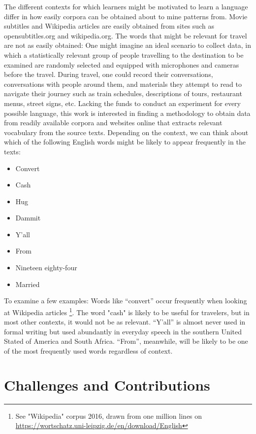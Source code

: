 The different contexts for which learners might be motivated to learn a language differ in how easily corpora can be obtained about to mine patterns from. Movie subtitles and Wikipedia articles are easily obtained from sites such as opensubtitles.org and wikipedia.org. The words that might be relevant for travel are not as easily obtained: One might imagine an ideal scenario to collect data, in which a statistically relevant group of people travelling to the destination to be examined are randomly selected and equipped with microphones and cameras before the travel. During travel, one could record their conversations, conversations with people around them, and materials they attempt to read to navigate their journey such as train schedules, descriptions of tours, restaurant menus, street signs, etc. Lacking the funds to conduct an experiment for every possible language, this work is interested in finding a methodology to obtain data from readily available corpora and websites online that extracts relevant vocabulary from the source texts.
Depending on the context, we can think about which of the following English words might be likely to appear frequently in the texts:

\begin{itemize}
	\item Convert
	\item Cash
	\item Hug
	\item Dammit
	\item Y'all
	\item From
	\item Nineteen eighty-four
	\item Married
\end{itemize}

To examine a few examples: Words like “convert” occur frequently when looking at Wikipedia articles \footnote{See "Wikipedia" corpus 2016, drawn from one million lines on \url{https://wortschatz.uni-leipzig.de/en/download/English}}. The word "cash" is likely to be useful for travelers, but in most other contexts, it would not be as relevant. “Y’all” is almost never used in formal writing but used abundantly in everyday speech in the southern United Stated of America and South Africa. “From”, meanwhile, will be likely to be one of the most frequently used words regardless of context.

\section{Challenges and Contributions}

